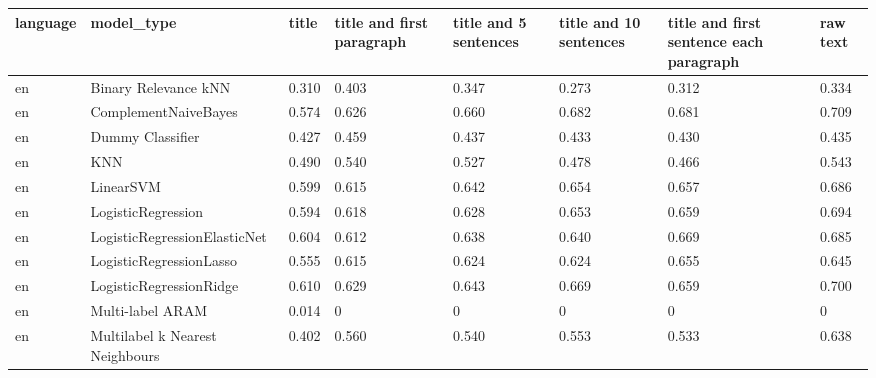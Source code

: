 \begin{tabular}{llllllll}
\toprule
language &                      model\_type & title & title and first paragraph & title and 5 sentences & title and 10 sentences & title and first sentence each paragraph &  raw text \\
\midrule
      en &            Binary Relevance kNN & 0.310 &                     0.403 &                 0.347 &                  0.273 &                                   0.312 &     0.334 \\
      en &            ComplementNaiveBayes & 0.574 &                     0.626 &                 0.660 &                  0.682 &                                   0.681 &     0.709 \\
      en &                Dummy Classifier & 0.427 &                     0.459 &                 0.437 &                  0.433 &                                   0.430 &     0.435 \\
      en &                             KNN & 0.490 &                     0.540 &                 0.527 &                  0.478 &                                   0.466 &     0.543 \\
      en &                       LinearSVM & 0.599 &                     0.615 &                 0.642 &                  0.654 &                                   0.657 &     0.686 \\
      en &              LogisticRegression & 0.594 &                     0.618 &                 0.628 &                  0.653 &                                   0.659 &     0.694 \\
      en &    LogisticRegressionElasticNet & 0.604 &                     0.612 &                 0.638 &                  0.640 &                                   0.669 &     0.685 \\
      en &         LogisticRegressionLasso & 0.555 &                     0.615 &                 0.624 &                  0.624 &                                   0.655 &     0.645 \\
      en &         LogisticRegressionRidge & 0.610 &                     0.629 &                 0.643 &                  0.669 &                                   0.659 &     0.700 \\
      en &                Multi-label ARAM & 0.014 &                         0 &                     0 &                      0 &                                       0 &         0 \\
      en & Multilabel k Nearest Neighbours & 0.402 &                     0.560 &                 0.540 &                  0.553 &                                   0.533 &     0.638 \\

\end{tabular}
